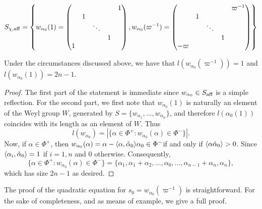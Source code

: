     \begin{equation*}
        S_{\chi,\mathrm{aff}}=\left\{w_{\alpha_0}(1)=\begin{pmatrix}
            &&&&1\\
            &1&&&\\
            &&\ddots&&\\
            &&&1&\\
            1&&&&\\
        \end{pmatrix}, w_{\alpha_0}(\varpi^{-1})=\begin{pmatrix}
            &&&&\varpi^{-1}\\
            &1&&&\\
            &&\ddots&&\\
            &&&1&\\
            -\varpi&&&&\\
        \end{pmatrix}\right\}
    \end{equation*}

    \begin{lemma}\label{lem_length}
        Under the circumstances discussed above, we have that $l(w_{\alpha_0}(\varpi^{-1}))=1$ and $l(w_{\alpha_0}(1))=2n-1$.
    \end{lemma}
    \begin{proof}
        The first part of the statement is immediate since $w_{\alpha_0}\in S_{\mathrm{aff}}$ is a simple reflection. For the second part, we first note that $w_{\alpha_0}(1)$ is naturally an element of the Weyl group $W$, generated by $S=\{w_{\alpha_1},\ldots,w_{\alpha_n}\}$, and therefore $l(\alpha_0(1))$ coincides with its length as an element of $W$. Thus
        $$l(w_{\alpha_0})=|\{\alpha\in\Phi^+:w_{\alpha_0}(\alpha)\in\Phi^-\}|.$$
        Now, if $\alpha\in\Phi^+$, then $w_{\alpha_0}(\alpha)=\alpha-\langle\alpha,\check{\alpha}_0\rangle\alpha_0\in\Phi^-$if and only if $\langle\alpha\check{\alpha}_0\rangle>0$. Since $\langle\alpha_i,\check{\alpha}_0\rangle=1$ if $i=1,n$ and $0$ otherwise. Consequently, 
        $$\{\alpha\in\Phi^+:w_{\alpha_0}(\alpha)\in\Phi^-\}=\{\alpha_1,\alpha_1+\alpha_2,\ldots,\alpha_0,\ldots,\alpha_{n-1}+\alpha_n,\alpha_n\},$$
        which has size $2n-1$ as desired.
    \end{proof}

    The proof of the quadratic equation for $s_0=w_{\alpha_0}(\varpi^{-1})$ is straightforward. For the sake of completeness, and as means of example, we give a full proof.
    
